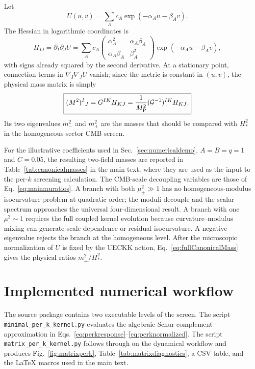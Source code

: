 \documentclass[aps,prd,twocolumn,superscriptaddress,nofootinbib,longbibliography,floatfix]{revtex4-2}
\newcommand{\Mpl}{\bar M_{\rm P}}
\begin{document}
Let
\begin{equation}
U(u,v)=\sum_A c_A\exp(-\alpha_A u-\beta_A v).
\end{equation}
The Hessian in logarithmic coordinates is
\begin{equation}
H_{IJ}=\partial_I\partial_JU
=\sum_A c_A
\begin{pmatrix}
\alpha_A^2&\alpha_A\beta_A\\
\alpha_A\beta_A&\beta_A^2
\end{pmatrix}
\exp(-\alpha_Au-\beta_Av),
\label{eq:fullHessianExp}
\end{equation}
with signs already squared by the second derivative. At a stationary point, connection terms in $\nabla_I\nabla_JU$ vanish; since the metric is constant in $(u,v)$, the physical mass matrix is simply
\begin{equation}
\boxed{
(M^2)^I{}_{J}=G^{IK}H_{KJ}
=\frac{1}{\Mpl^2}(\mathcal G^{-1})^{IK}H_{KJ}.
}
\label{eq:fullCanonicalMass}
\end{equation}
Its two eigenvalues $m_-^2$ and $m_+^2$ are the masses that should be compared with $H_*^2$ in the homogeneous-sector CMB screen.

For the illustrative coefficients used in Sec.~\ref{sec:numericaldemo}, $A=B=q=1$ and $C=0.05$, the resulting two-field masses are reported in Table~\ref{tab:canonicalmasses} in the main text, where they are used as the input to the per-$k$ screening calculation. The CMB-scale decoupling variables are those of Eq.~\eqref{eq:mainmuratios}.
A branch with both $\mu_\pm^2\gg1$ has no homogeneous-modulus isocurvature problem at quadratic order; the moduli decouple and the scalar spectrum approaches the universal four-dimensional result. A branch with one $\mu^2\sim1$ requires the full coupled kernel evolution because curvature--modulus mixing can generate scale dependence or residual isocurvature. A negative eigenvalue rejects the branch at the homogeneous level. After the microscopic normalization of $U$ is fixed by the UECKK action, Eq.~\eqref{eq:fullCanonicalMass} gives the physical ratios $m_\pm^2/H_*^2$.

\section{Implemented numerical workflow}
\label{app:numericalworkflow}
The source package contains two executable levels of the screen.  The script \texttt{minimal\_per\_k\_kernel.py} evaluates the algebraic Schur-complement approximation in Eqs.~\eqref{eq:perkresponse}--\eqref{eq:perknormalized}.  The script \texttt{matrix\_per\_k\_kernel.py} follows through on the dynamical workflow and produces Fig.~\ref{fig:matrixperk}, Table~\ref{tab:matrixdiagnostics}, a CSV table, and the \LaTeX{} macros used in the main text.
\end{document}
